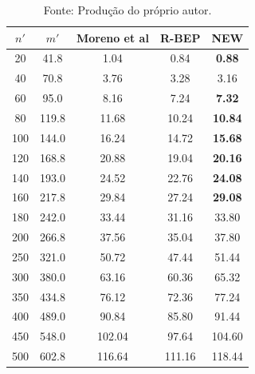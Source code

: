 \begin{table}[ht]
\footnotesize
\centering
\begin{minipage}{0.45\textwidth}
    \centering
    \caption{\small Resultados mínimos em instâncias pequenas e médias.}
        \begin{tabular}{cc|ccc}
            \hline
            \rowcolor{gray!30} \textbf{\( n' \)} & \textbf{\( m' \)}& \textbf{Moreno et al} & \textbf{R-BEP} & \textbf{NEW} \\
            \hline
            20  & 41.8  & 1.04  &\cellcolor{blue!20}0.84   & \textbf{0.88}  \\
            40  & 70.8  & 3.76  &3.28                      & \cellcolor{blue!20}3.16  \\
            60  & 95.0  & 8.16  &\cellcolor{blue!20}7.24   & \textbf{7.32}  \\
            80  & 119.8 & 11.68 &\cellcolor{blue!20}10.24  & \textbf{10.84} \\
            100 & 144.0 & 16.24 &\cellcolor{blue!20}14.72  & \textbf{15.68} \\
            120 & 168.8 & 20.88 &\cellcolor{blue!20}19.04  & \textbf{20.16} \\
            140 & 193.0 & 24.52 &\cellcolor{blue!20}22.76  & \textbf{24.08} \\
            160 & 217.8 & 29.84 &\cellcolor{blue!20}27.24  & \textbf{29.08} \\
            180 & 242.0 & 33.44 &\cellcolor{blue!20}31.16  & 33.80 \\
            200 & 266.8 & 37.56 &\cellcolor{blue!20}35.04  & 37.80 \\
            250 & 321.0 & 50.72 &\cellcolor{blue!20}47.44  & 51.44 \\
            300 & 380.0 & 63.16 &\cellcolor{blue!20}60.36  & 65.32 \\
            350 & 434.8 & 76.12 &\cellcolor{blue!20}72.36  & 77.24 \\
            400 & 489.0 & 90.84 &\cellcolor{blue!20}85.80  & 91.44 \\
            450 & 548.0 & 102.04 &\cellcolor{blue!20}97.64  & 104.60 \\
            500 & 602.8 & 116.64&\cellcolor{blue!20}111.16 & 118.44 \\
            \hline
        \end{tabular}
    \caption*{\small Fonte: Produção do próprio autor.}
    \label{tab:construct-regressao-mediun}
\end{minipage}%

\end{table}
